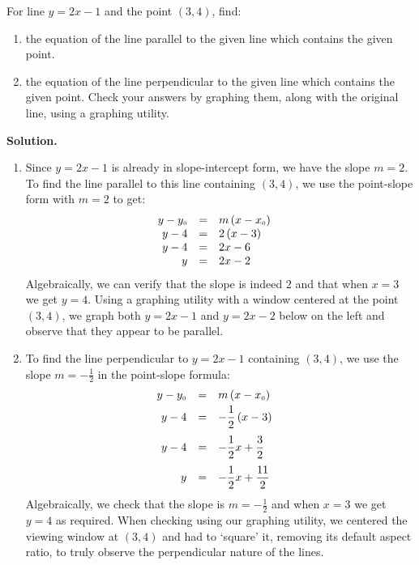 \begin{ex}  For line $y = 2x-1$ and the point $(3,4)$, find:

\begin{enumerate}

\item the equation of the line parallel to the given line which contains the given point.

\item   the equation of the line perpendicular to the given line which contains the given point.  Check your answers by graphing them, along with the original line, using a graphing utility.

\end{enumerate}

{\bf Solution.}

\begin{enumerate}

\item Since $y = 2x-1$ is already in slope-intercept form, we have the slope $m = 2$.  To find the line parallel to this line containing $(3,4)$, we use the point-slope form with $m = 2$ to get: \[\begin{array}{rclr} 
y - y_{\mbox{\tiny$0$}} & = & m\left(x - x_{\mbox{\tiny$0$}}\right)  & \\
y - 4 & = & 2 \left(x - 3\right) & \\
y - 4 & = & 2x - 6 & \\
y& = & 2x-2\\
\end{array} \] Algebraically, we can verify that the slope is indeed $2$ and that when $x =3$ we get $y = 4$.  Using a graphing utility with a window centered at the point $(3, 4)$,  we graph both $y = 2x-1$ and $y = 2x-2$ below on the left and observe that they appear to be parallel.

\item To find the line perpendicular to $y = 2x-1$ containing $(3,4)$, we use the slope $m = -\frac{1}{2}$ in the point-slope formula:\[\begin{array}{rclr} 
y - y_{\mbox{\tiny$0$}} & = & m\left(x - x_{\mbox{\tiny$0$}}\right)  & \\ [3pt]
y - 4 & = & -\dfrac{1}{2} \left(x - 3\right) & \\ [10pt]
y - 4 & = & -\dfrac{1}{2} x + \dfrac{3}{2} & \\ [10pt]
y& = & -\dfrac{1}{2} x + \dfrac{11}{2}\\
\end{array} \]  Algebraically, we check that the slope is $m = -\frac{1}{2}$ and when $x = 3$ we get $y = 4$ as required.  When checking using our graphing utility, we centered the viewing window at $(3, 4)$ and had to `square' it, removing its default aspect ratio, to truly observe the perpendicular nature of the lines.


\end{enumerate}
\end{ex}
